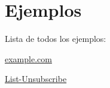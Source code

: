 \section{Ejemplos}
Lista de todos los ejemplos\+:\begin{DoxyCompactItemize}
\item 
\hyperlink{example_8com-example}{example.\+com}
\item 
\hyperlink{List-Unsubscribe-example}{List-\/\+Unsubscribe}
\end{DoxyCompactItemize}
